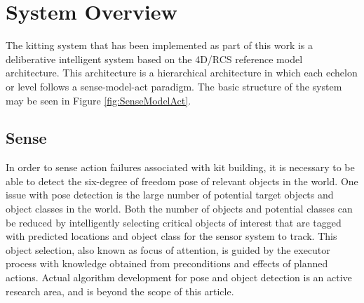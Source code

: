 \section{System Overview}
\label{sect:overview}
The kitting system that has been implemented as part of this work is a deliberative intelligent system based on the 4D/RCS 
reference model architecture\cite{Albus2000}. This architecture is a hierarchical architecture in which each echelon or level
follows a sense-model-act paradigm. The basic structure of the system may be seen in Figure \ref{fig:SenseModelAct}.
%
\subsection{Sense}
\label{subsection:Sense}
In order to sense action failures associated with kit building, it is necessary to be able to detect the six-degree of freedom pose of relevant objects in the
world. One issue with pose detection is the large number of potential target objects and object classes in the world. 
Both the number of objects and potential classes can be reduced by intelligently
selecting critical objects of interest that are tagged with predicted locations and object class for the sensor system to track. This object selection, 
also known as focus of attention, is guided by
the executor process with knowledge obtained from preconditions and effects of planned actions.
Actual algorithm development for pose and object detection is an active research area, and is beyond the scope of this article. 

